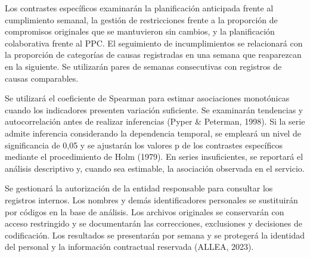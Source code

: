 \documentclass[12pt,a4paper]{article}
\begin{document}
Los contrastes específicos examinarán la planificación anticipada frente al cumplimiento semanal, la gestión de restricciones frente a la proporción de compromisos originales que se mantuvieron sin cambios, y la planificación colaborativa frente al PPC. El seguimiento de incumplimientos se relacionará con la proporción de categorías de causas registradas en una semana que reaparezcan en la siguiente. Se utilizarán pares de semanas consecutivas con registros de causas comparables.

Se utilizará el coeficiente de Spearman para estimar asociaciones monotónicas cuando los indicadores presenten variación suficiente. Se examinarán tendencias y autocorrelación antes de realizar inferencias (Pyper \& Peterman, 1998). Si la serie admite inferencia considerando la dependencia temporal, se empleará un nivel de significancia de 0,05 y se ajustarán los valores p de los contrastes específicos mediante el procedimiento de Holm (1979). En series insuficientes, se reportará el análisis descriptivo y, cuando sea estimable, la asociación observada en el servicio.

Se gestionará la autorización de la entidad responsable para consultar los registros internos. Los nombres y demás identificadores personales se sustituirán por códigos en la base de análisis. Los archivos originales se conservarán con acceso restringido y se documentarán las correcciones, exclusiones y decisiones de codificación. Los resultados se presentarán por semana y se protegerá la identidad del personal y la información contractual reservada (ALLEA, 2023).
\end{document}

